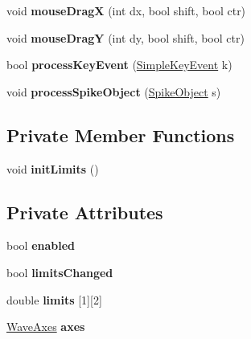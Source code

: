 \begin{DoxyCompactItemize}
\item 
\hypertarget{classElectrodePlot_ac44b6d1e18c9a6d8f9d6ae4df1c626b4}{void {\bfseries mouse\-Drag\-X} (int dx, bool shift, bool ctr)}\label{classElectrodePlot_ac44b6d1e18c9a6d8f9d6ae4df1c626b4}

\item 
\hypertarget{classElectrodePlot_a5d165e2e1907d1d8092b124943ab6708}{void {\bfseries mouse\-Drag\-Y} (int dy, bool shift, bool ctr)}\label{classElectrodePlot_a5d165e2e1907d1d8092b124943ab6708}

\item 
\hypertarget{classElectrodePlot_a6bf5d37448860059c5e2b8366d08a112}{bool {\bfseries process\-Key\-Event} (\hyperlink{structSimpleKeyEvent}{Simple\-Key\-Event} k)}\label{classElectrodePlot_a6bf5d37448860059c5e2b8366d08a112}

\item 
\hypertarget{classElectrodePlot_ae2aa2a0ccd12d7df8fdf9d563e239298}{void {\bfseries process\-Spike\-Object} (\hyperlink{structSpikeObject}{Spike\-Object} s)}\label{classElectrodePlot_ae2aa2a0ccd12d7df8fdf9d563e239298}

\end{DoxyCompactItemize}
\subsection*{Private Member Functions}
\begin{DoxyCompactItemize}
\item 
\hypertarget{classElectrodePlot_a2fa9ec77bee7b1820b336fc7edae240a}{void {\bfseries init\-Limits} ()}\label{classElectrodePlot_a2fa9ec77bee7b1820b336fc7edae240a}

\end{DoxyCompactItemize}
\subsection*{Private Attributes}
\begin{DoxyCompactItemize}
\item 
\hypertarget{classElectrodePlot_a237f3969769bc74af0006c7a79d07e91}{bool {\bfseries enabled}}\label{classElectrodePlot_a237f3969769bc74af0006c7a79d07e91}

\item 
\hypertarget{classElectrodePlot_ae0a7e535cdff2c9a50e2eb2eb0cf9218}{bool {\bfseries limits\-Changed}}\label{classElectrodePlot_ae0a7e535cdff2c9a50e2eb2eb0cf9218}

\item 
\hypertarget{classElectrodePlot_a825cf17531fb7811bea0e55ff9a81cab}{double {\bfseries limits} \mbox{[}1\mbox{]}\mbox{[}2\mbox{]}}\label{classElectrodePlot_a825cf17531fb7811bea0e55ff9a81cab}

\item 
\hypertarget{classElectrodePlot_a2b5edc11ad304fbf2702377462b0ca28}{\hyperlink{classWaveAxes}{Wave\-Axes} {\bfseries axes}}\label{classElectrodePlot_a2b5edc11ad304fbf2702377462b0ca28}

\end{DoxyCompactItemize}
